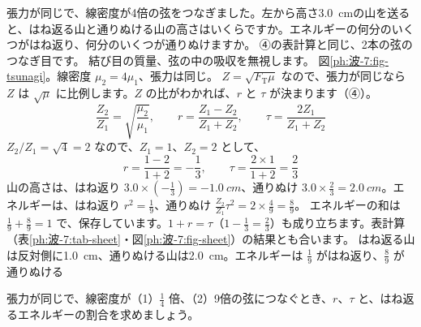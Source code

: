 \label{ph:波-7:ex4}
\begin{phreidai}
張力が同じで、線密度が4倍の弦をつなぎました。左から高さ\qty{3.0}{cm}の山を送ると、はね返る山と通りぬける山の高さはいくらですか。エネルギーの何分のいくつがはね返り、何分のいくつが通りぬけますか。
\phbamen
④の表計算と同じ、2本の弦のつなぎ目です。
\phmushi
結び目の質量、弦の中の吸収を無視します。
\phzu
図\ref{ph:波-7:fig-tsunagi}。線密度 $\mu_2=4\mu_1$、張力は同じ。
\phriyu
$Z=\sqrt{F_{\mathrm T}\mu}$ なので、張力が同じなら $Z$ は $\sqrt\mu$ に比例します。$Z$ の比がわかれば、$r$ と $\tau$ が決まります（④）。
\phtateru
\[\frac{Z_2}{Z_1}=\sqrt{\frac{\mu_2}{\mu_1}},\qquad r=\frac{Z_1-Z_2}{Z_1+Z_2},\qquad\tau=\frac{2Z_1}{Z_1+Z_2}\]
\phtoku
$Z_2/Z_1=\sqrt4=2$ なので、$Z_1=1$、$Z_2=2$ として、
\[r=\frac{1-2}{1+2}=-\frac13,\qquad\tau=\frac{2\times1}{1+2}=\frac23\]
山の高さは、はね返り $3.0\times(-\tfrac13)=\qty{-1.0}{cm}$、通りぬけ $3.0\times\tfrac23=\qty{2.0}{cm}$。エネルギーは、はね返り $r^2=\tfrac19$、通りぬけ $\tfrac{Z_2}{Z_1}\tau^2=2\times\tfrac49=\tfrac89$。
\phtashikame
エネルギーの和は $\tfrac19+\tfrac89=1$ で、保存しています。$1+r=\tau$（$1-\tfrac13=\tfrac23$）も成り立ちます。表計算（表\ref{ph:波-7:tab-sheet}・図\ref{ph:波-7:fig-sheet}）の結果とも合います。
\kotae はね返る山は反対側に\qty{1.0}{cm}、通りぬける山は\qty{2.0}{cm}。エネルギーは $\tfrac19$ がはね返り、$\tfrac89$ が通りぬける
\end{phreidai}
\begin{jibun}
張力が同じで、線密度が（1）$\tfrac14$ 倍、（2）9倍の弦につなぐとき、$r$、$\tau$ と、はね返るエネルギーの割合を求めましょう。
\end{jibun}

